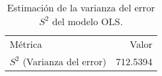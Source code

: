 \begin{table}[H]
    \centering
    \color{blue}
    \caption{Estimación de la varianza del error $S^2$ del modelo OLS.}
    \label{tab:varianza_error}
    \begin{tabular}{lr}
        
        Métrica & Valor \\
        
        $S^2$ (Varianza del error) & 712.5394 \\
        
    \end{tabular}
\end{table}
